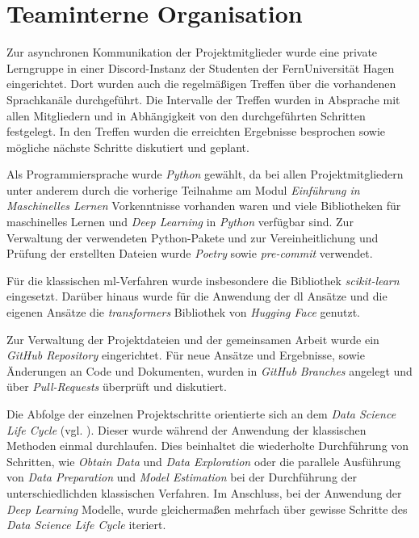 \section{Teaminterne Organisation}\label{sec:teaminterneorganisation}

Zur asynchronen Kommunikation der Projektmitglieder wurde eine private Lerngruppe in einer Discord-Instanz der Studenten der FernUniversität Hagen eingerichtet.
Dort wurden auch die regelmäßigen Treffen über die vorhandenen Sprachkanäle durchgeführt.
Die Intervalle der Treffen wurden in Absprache mit allen Mitgliedern und in Abhängigkeit von den durchgeführten Schritten festgelegt.
In den Treffen wurden die erreichten Ergebnisse besprochen sowie mögliche nächste Schritte diskutiert und geplant.

Als Programmiersprache wurde \textit{Python} gewählt, da bei allen Projektmitgliedern unter anderem durch die vorherige Teilnahme am Modul \textit{Einführung in Maschinelles Lernen} Vorkenntnisse vorhanden waren und viele Bibliotheken für maschinelles Lernen und \textit{Deep Learning} in \textit{Python} verfügbar sind.
Zur Verwaltung der verwendeten Python-Pakete und zur Vereinheitlichung und Prüfung der erstellten Dateien wurde \textit{Poetry} \cite{poetry2025} sowie \textit{pre-commit} \cite{precommit2025} verwendet.

Für die klassischen \gls{ml}-Verfahren wurde insbesondere die Bibliothek \textit{scikit-learn} eingesetzt.
Darüber hinaus wurde für die Anwendung der \gls{dl} Ansätze und die eigenen Ansätze die \textit{transformers} Bibliothek von \textit{Hugging Face} genutzt.

Zur Verwaltung der Projektdateien und der gemeinsamen Arbeit wurde ein \textit{GitHub Repository} \cite{githubrepo2025} eingerichtet.
Für neue Ansätze und Ergebnisse, sowie Änderungen an Code und Dokumenten, wurden in \textit{GitHub} \textit{Branches} angelegt und über \textit{Pull-Requests} überprüft und diskutiert.

Die Abfolge der einzelnen Projektschritte orientierte sich an dem \textit{Data Science Life Cycle} (vgl. \cite[Abb. 2]{Stodden2020}).
Dieser wurde während der Anwendung der klassischen Methoden einmal durchlaufen.
Dies beinhaltet die wiederholte Durchführung von Schritten, wie \textit{Obtain Data} und \textit{Data Exploration} oder die parallele Ausführung von \textit{Data Preparation} und \textit{Model Estimation} bei der Durchführung der unterschiedlichden klassischen Verfahren.
Im Anschluss, bei der Anwendung der \textit{Deep Learning} Modelle, wurde gleichermaßen mehrfach über gewisse Schritte des \textit{Data Science Life Cycle} iteriert.

